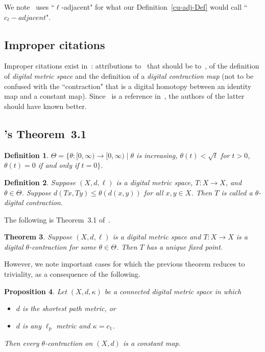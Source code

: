 \documentclass{article}
\newtheorem{thm}{Theorem}
\newtheorem{prop}[thm]{Proposition}
\newtheorem{definition}[thm]{Definition}
\numberwithin{thm}{section}
\begin{document}
We note~\cite{GuptaEtal} uses
``$\ell$-adjacent" for what our
Definition~\ref{cu-adj-Def} would call
``$c_{\ell}-adjacent$".

\subsection{Improper citations}
Improper citations
exist
in~\cite{GuptaEtal}:
attributions to~\cite{HanBanach}
that should be
to~\cite{EgeKaraca15},
of the definition of
{\em digital metric space} and the 
definition of a {\em digital contraction
map} (not to be 
confused with
the ``contraction"
that is a digital
homotopy between an
identity map and a
constant map). Since~\cite{EgeKaraca15} is a reference
in~\cite{GuptaEtal},
the authors of the
latter should have
known better.

\subsection{\cite{GuptaEtal}'s Theorem~3.1}
\begin{definition}
    {\rm \cite{GuptaEtal}}
    $\Theta = \{
    \theta: [0,\infty) \to
    [0,\infty) \mid
    \theta$ is increasing,
    $\theta(t) < \sqrt{t}$ for $t>0$, $\theta(t)=0$
    if and only if
    $t=0 \}$.
\end{definition}

\begin{definition}
    {\rm \cite{GuptaEtal}}
    Suppose $(X,d,\ell)$ is
    a digital metric
    space, $T: X \to X$, and
    $\theta \in \Theta$. Suppose
    $d(Tx,Ty) \le
    \theta(d(x,y))$
    for all $x,y \in X$. Then $T$
    is called a
    $\theta${\em -digital
    contraction}.
\end{definition}

The following is Theorem~3.1
of~\cite{GuptaEtal}.

\begin{thm}
\label{Gupta3.1}
    Suppose $(X,d,\ell)$ is a digital metric
    space and $T: X \to X$ is
    a digital $\theta$-contraction for
    some $\theta \in \Theta$.
    Then $T$ has a unique fixed point.
\end{thm}

However, we note important cases for which the
previous theorem reduces to triviality, as a 
consequence of the following.

\begin{prop}
{\rm \cite{BxBad7}}
    Let $(X,d,\kappa)$ be a 
    connected digital metric space in which
    \begin{itemize}
        \item $d$ is the shortest path metric, or
        \item $d$ is any $\ell_p$ metric and
              $\kappa = c_1$.
    \end{itemize} 
 Then every $\theta$-contraction
    on $(X,d)$ is a constant map.
\end{prop}
\end{document}
